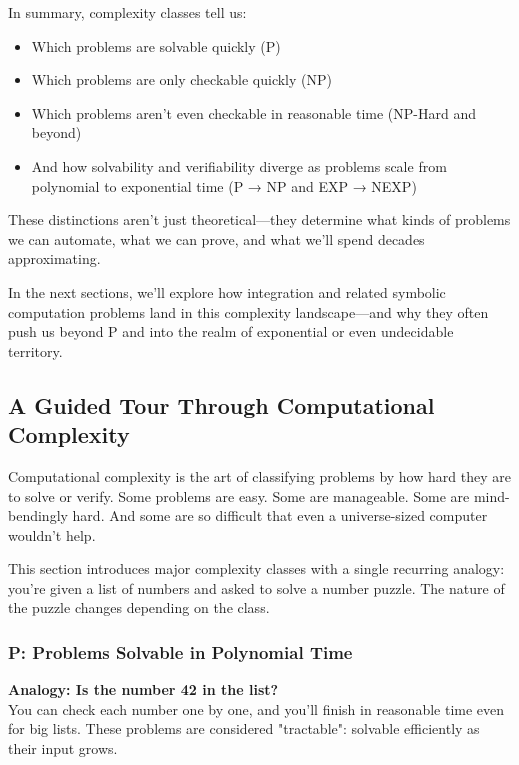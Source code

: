 \medskip

\noindent In summary, complexity classes tell us:

\begin{itemize}
  \item Which problems are solvable quickly (P)
  \item Which problems are only checkable quickly (NP)
  \item Which problems aren’t even checkable in reasonable time (NP-Hard and beyond)
  \item And how solvability and verifiability diverge as problems scale from polynomial to exponential time (P → NP and EXP → NEXP)
\end{itemize}

\noindent These distinctions aren’t just theoretical—they determine what kinds of problems we can automate, what we can prove, and what we’ll spend decades approximating.

In the next sections, we’ll explore how integration and related symbolic computation problems land in this complexity landscape—and why they often push us beyond P and into the realm of exponential or even undecidable territory.




\subsection{A Guided Tour Through Computational Complexity}

Computational complexity is the art of classifying problems by how hard they are to solve or verify. Some problems are easy. Some are manageable. Some are mind-bendingly hard. And some are so difficult that even a universe-sized computer wouldn't help.

This section introduces major complexity classes with a single recurring analogy: you're given a list of numbers and asked to solve a number puzzle. The nature of the puzzle changes depending on the class.

\subsubsection{P: Problems Solvable in Polynomial Time}

\textbf{Analogy: Is the number 42 in the list?} \\
You can check each number one by one, and you'll finish in reasonable time even for big lists. These problems are considered "tractable": solvable efficiently as their input grows.

